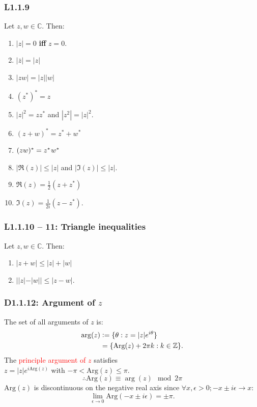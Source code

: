 \documentclass{article}
\newcommand{\deq}{\vcentcolon=}
\begin{document}
\begin{multicols*}{3}
\newcolumn

\subsubsection*{L1.1.9}
Let $z,w\in\mathbb{C}$. Then:
\begin{enumerate}
    \item $|z|=0$ \textbf{if{}f} $z=0$.
    
    \item $|\overline{z}|=|z|$
    
    \item $|zw|=|z||w|$
    
    \item $(z^*)^*=z$
    
    \item $|z|^2=zz^*$ and $|z^2|=|z|^2$.
    
    \item $(z+w)^*=z^*+w^*$
    
    \item $(zw)^*=z^*\hspace{0.01in}w^*$
    
    \item $|\Re(z)|\leq|z|$ and $|\Im(z)|\leq|z|$.
    
    \item $\Re(z)=\frac{1}{2}(z+z^*)$
    
    \item $\Im(z)=\frac{1}{2i}(z-z^*)$.
\end{enumerate}

\subsubsection*{L1.1.10 -- 11: Triangle inequalities}
Let $z,w\in\mathbb{C}$. Then:
\begin{enumerate}
    \item $|z+w|\leq|z|+|w|$
    
    \item $||z|-|w||\leq|z-w|$.
\end{enumerate}

\subsubsection*{D1.1.12: Argument of $z$}
The set of all arguments of $z$ is:
\begin{align*}
    \arg(z)
    &\deq\{\theta:z=|z|e^{i\theta}\} \\
    &=\{\text{Arg}(z)+2\pi k:k\in\mathbb{Z}\}.
\end{align*}
The \textcolor{red}
{principle argument of $z$} satisfies \\
$z=|z|e^{i\text{Arg}(z)}$ with
$-\pi<\text{Arg}(z)\leq\pi$.
$$\therefore\text{Arg}(z)\equiv\arg(z)\mod 2\pi$$
$\text{Arg}(z)$ is discontinuous on the negative real axis
since $\forall x,\epsilon>0;-x\pm i\epsilon\rightarrow x$:
$$\lim_{\epsilon\rightarrow0}\text{Arg}(-x\pm i\epsilon)=\pm\pi.$$


\end{multicols*}
\end{document}
